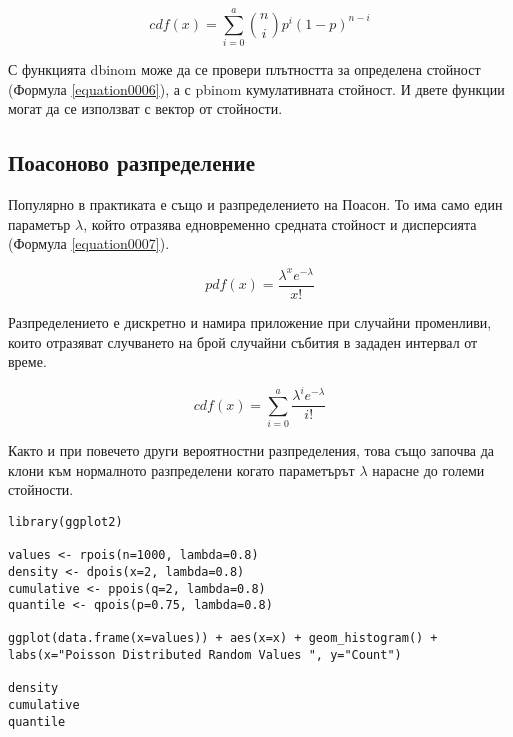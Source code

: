 \begin{equation}
cdf(x) = \sum_{i=0}^{a}\binom{n}{i}p^{i}(1-p)^{n-i}
\label{equation0006}
\end{equation}

С функцията dbinom може да се провери плътността за определена стойност (Формула \ref{equation0006}), а с pbinom кумулативната стойност. И двете функции могат да се използват с вектор от стойности. 

\subsection{Поасоново разпределение}

Популярно в практиката е също и разпределението на Поасон. То има само един параметър $\lambda$, който отразява едновременно средната стойност и дисперсията (Формула \ref{equation0007}). 

\begin{equation}
pdf(x) = \frac{\lambda^{x}e^{-\lambda}}{x!}
\label{equation0007}
\end{equation}

Разпределението е дискретно и намира приложение при случайни променливи, които отразяват случването на брой случайни събития в зададен интервал от време. 

\begin{equation}
cdf(x) = \sum_{i=0}^{a}\frac{\lambda^{i}e^{-\lambda}}{i!}
\label{equation0008}
\end{equation}

Както и при повечето други вероятностни разпределения, това също започва да клони към нормалното разпределени когато параметърът $\lambda$ нарасне до големи стойности. 

\begin{lstlisting}[caption=Разпределение на Поасон, label=listing0159]
library(ggplot2)

values <- rpois(n=1000, lambda=0.8)
density <- dpois(x=2, lambda=0.8)
cumulative <- ppois(q=2, lambda=0.8)
quantile <- qpois(p=0.75, lambda=0.8)

ggplot(data.frame(x=values)) + aes(x=x) + geom_histogram() + labs(x="Poisson Distributed Random Values ", y="Count")

density
cumulative
quantile
\end{lstlisting}

